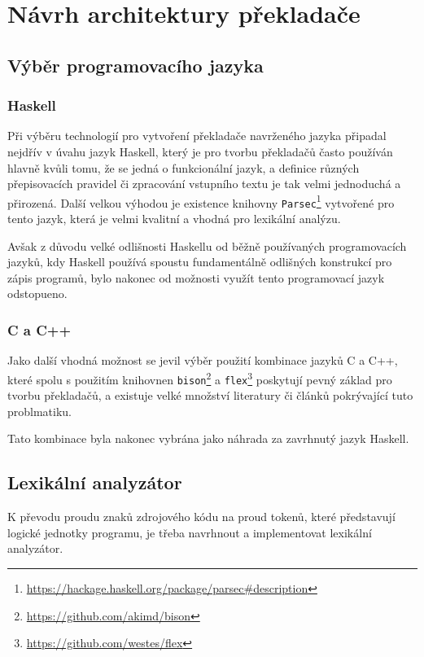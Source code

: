 \documentclass[12pt, a4paper]{article}
\let\oldsection\section
\renewcommand\section{\clearpage\oldsection}
\begin{document}
\section{Návrh architektury překladače}

\subsection{Výběr programovacího jazyka}
\subsubsection{Haskell}
Při výběru technologií pro vytvoření překladače navrženého jazyka připadal nejdřív v úvahu jazyk Haskell, který je pro tvorbu překladačů často používán hlavně kvůli tomu, že se jedná o funkcionální jazyk, a definice různých přepisovacích pravidel či zpracování vstupního textu je tak velmi jednoduchá a přirozená. Další velkou výhodou je existence knihovny \texttt{Parsec}\footnote{\url{https://hackage.haskell.org/package/parsec#description}} vytvořené pro tento jazyk, která je velmi kvalitní a vhodná pro lexikální analýzu.

 Avšak z důvodu velké odlišnosti Haskellu od běžně používaných programovacích jazyků, kdy Haskell používá spoustu fundamentálně odlišných konstrukcí pro zápis programů, bylo nakonec od možnosti využít tento programovací jazyk odstopueno.
 
\subsubsection{C a C++}
Jako další vhodná možnost se jevil výběr použití kombinace jazyků C a C++, které spolu s použitím knihovnen \texttt{bison}\footnote{\url{https://github.com/akimd/bison}} a \texttt{flex}\footnote{\url{https://github.com/westes/flex}} poskytují pevný základ pro tvorbu překladačů, a existuje velké množství literatury či článků pokrývající tuto problmatiku.

Tato kombinace byla nakonec vybrána jako náhrada za zavrhnutý jazyk Haskell.


\subsection{Lexikální analyzátor}

K převodu proudu znaků zdrojového kódu na proud tokenů, které představují logické jednotky programu, je třeba navrhnout a implementovat lexikální analyzátor. 
\end{document}

